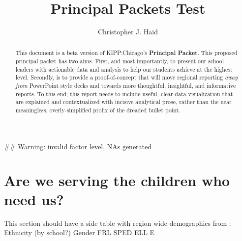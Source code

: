 \documentclass[sfsidenotes, justified]{tufte-handout}\usepackage{graphicx, color}
\title{Principal Packets Test}
\author{Christopher J. Haid}
\makeatletter
\newenvironment{kframe}{%
 \def\at@end@of@kframe{}%
 \ifinner\ifhmode%
  \def\at@end@of@kframe{\end{minipage}}%
  \begin{minipage}{\columnwidth}%
 \fi\fi%
 \def\FrameCommand##1{\hskip\@totalleftmargin \hskip-\fboxsep
 \colorbox{shadecolor}{##1}\hskip-\fboxsep
     \hskip-\linewidth \hskip-\@totalleftmargin \hskip\columnwidth}%
 \MakeFramed {\advance\hsize-\width
   \@totalleftmargin\z@ \linewidth\hsize
   \@setminipage}}%
 {\par\unskip\endMakeFramed%
 \at@end@of@kframe}
\newenvironment{knitrout}{}{} %
\makeatother
\begin{document}
\maketitle
\begin{abstract}
This document is a beta version of KIPP:Chicago's \textbf{Principal Packet}.  This proposed principal packet has two aims.  First, and most importantly, to present our school leaders with actionable data and analysis to help our students achieve at the highest level.  Secondly, is to provide a proof-of-concept that will move regional reporting \emph{away from} PowerPoint style decks and towards more thoughtful, insightful, and informative reports.  To this end, this report needs to include useful, clear data visualization that are explained and contextualized with incisive analytical prose, rather than the near meaningless, overly-simplified prolix of the dreaded bullet point.
\end{abstract}










\begin{knitrout}
\color{fgcolor}\begin{kframe}


{\ttfamily\noindent\textcolor{warningcolor}{\#\# Warning: invalid factor level, NAs generated}}\end{kframe}
\end{knitrout}













  











\section{Are we serving the children who need us?}
This section should have a side table with region wide demographics from :
  Ethnicity (by school?)
  Gender
  FRL
  SPED
  ELL
  E
\end{document}
